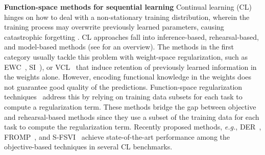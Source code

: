 \documentclass{article}
\makeatletter
\newcommand{\eg}{\textit{e.g.\@}\xspace}
\makeatother
\begin{document}

\textbf{Function-space methods for sequential learning} 
Continual learning (CL) hinges on how to deal with a non-stationary training distribution, wherein the training process may overwrite previously learned parameters, causing catastrophic forgetting \citep{mccloskey1989catastrophic}. CL approaches fall into inference-based, rehearsal-based, and model-based methods (see \cite{parisi2019continual, de2021continual} for an overview). The methods in the first category usually tackle this problem with weight-space regularization, such as EWC~\citep{kirkpatrick2017overcoming}, SI~\citep{zenke17a}), or VCL~\citep{nguyen-tuongModel2009} that induce retention of previously learned information in the weights alone. However, encoding functional knowledge in the weights does not guarantee good quality of the predictions. Function-space regularization techniques~\cite{li2018lwf, benjamin2018measuring, titsias2019functional, buzzega2020dark, pan2020continual, rudner2022continual} address this by relying on training data subsets for each task to compute a regularization term. These methods bridge the gap between objective and rehearsal-based methods  since they use a subset of the training data for each task to compute the regularization term. Recently proposed methods, \eg, DER~\citep{buzzega2020dark}, FROMP~\citep{pan2020continual}, and S-FSVI~\citep{rudner2022continual} achieve state-of-the-art performance among the objective-based techniques in several CL benchmarks. 
\end{document}
